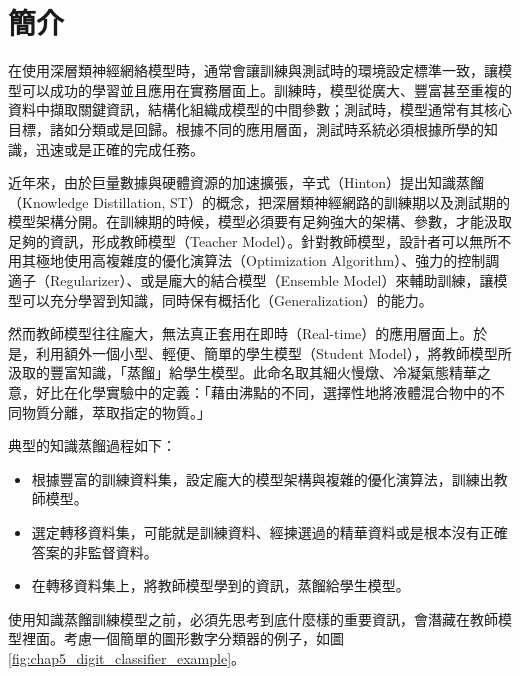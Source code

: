 \section{簡介}
在使用深層類神經網絡模型時，通常會讓訓練與測試時的環境設定標準一致，讓模型可以成功的學習並且應用在實務層面上。訓練時，模型從廣大、豐富甚至重複的資料中擷取關鍵資訊，結構化組織成模型的中間參數；測試時，模型通常有其核心目標，諸如分類或是回歸。根據不同的應用層面，測試時系統必須根據所學的知識，迅速或是正確的完成任務。

近年來，由於巨量數據與硬體資源的加速擴張，辛式（Hinton）提出知識蒸餾（Knowledge Distillation, ST）的概念\cite{hinton2015distilling}，把深層類神經網路的訓練期以及測試期的模型架構分開。在訓練期的時候，模型必須要有足夠強大的架構、參數，才能汲取足夠的資訊，形成教師模型（Teacher Model）。針對教師模型，設計者可以無所不用其極地使用高複雜度的優化演算法（Optimization Algorithm）、強力的控制調適子（Regularizer）、或是龐大的結合模型（Ensemble Model）來輔助訓練，讓模型可以充分學習到知識，同時保有概括化（Generalization）的能力。

然而教師模型往往龐大，無法真正套用在即時（Real-time）的應用層面上。於是，利用額外一個小型、輕便、簡單的學生模型（Student Model），將教師模型所汲取的豐富知識，「蒸餾」給學生模型。此命名取其細火慢燉、冷凝氣態精華之意，好比在化學實驗中的定義：「藉由沸點的不同，選擇性地將液體混合物中的不同物質分離，萃取指定的物質。」

典型的知識蒸餾過程如下：

\begin{itemize}
\itemsep -2pt
 \item 根據豐富的訓練資料集，設定龐大的模型架構與複雜的優化演算法，訓練出教師模型。
 \item 選定轉移資料集，可能就是訓練資料、經揀選過的精華資料或是根本沒有正確答案的非監督資料。
 \item 在轉移資料集上，將教師模型學到的資訊，蒸餾給學生模型。
\end{itemize} 

使用知識蒸餾訓練模型之前，必須先思考到底什麼樣的重要資訊，會潛藏在教師模型裡面。考慮一個簡單的圖形數字分類器的例子，如圖\ref{fig:chap5_digit_classifier_example}。

